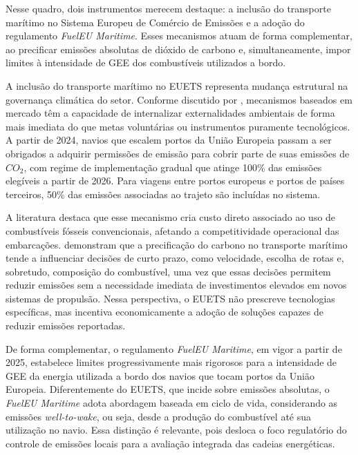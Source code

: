 Nesse quadro, dois instrumentos merecem destaque: a inclusão do transporte marítimo no Sistema Europeu de Comércio de Emissões e a adoção do regulamento \emph{FuelEU Maritime}. Esses mecanismos atuam de forma complementar, ao precificar emissões absolutas de dióxido de carbono e, simultaneamente, impor limites à intensidade de \gls{GEE} dos combustíveis utilizados a bordo.

A inclusão do transporte marítimo no \gls{EUETS} representa mudança estrutural na governança climática do setor. Conforme discutido por \citet{psaraftis_comparative_2021}, mecanismos baseados em mercado têm a capacidade de internalizar externalidades ambientais de forma mais imediata do que metas voluntárias ou instrumentos puramente tecnológicos. A partir de 2024, navios que escalem portos da União Europeia passam a ser obrigados a adquirir permissões de emissão para cobrir parte de suas emissões de $CO_2$, com regime de implementação gradual que atinge 100\% das emissões elegíveis a partir de 2026. Para viagens entre portos europeus e portos de países terceiros, 50\% das emissões associadas ao trajeto são incluídas no sistema.

A literatura destaca que esse mecanismo cria custo direto associado ao uso de combustíveis fósseis convencionais, afetando a competitividade operacional das embarcações. \citet{psaraftis_comparative_2021} demonstram que a precificação do carbono no transporte marítimo tende a influenciar decisões de curto prazo, como velocidade, escolha de rotas e, sobretudo, composição do combustível, uma vez que essas decisões permitem reduzir emissões sem a necessidade imediata de investimentos elevados em novos sistemas de propulsão. Nessa perspectiva, o \gls{EUETS} não prescreve tecnologias específicas, mas incentiva economicamente a adoção de soluções capazes de reduzir emissões reportadas.

De forma complementar, o regulamento \emph{FuelEU Maritime}, em vigor a partir de 2025, estabelece limites progressivamente mais rigorosos para a intensidade de \gls{GEE} da energia utilizada a bordo dos navios que tocam portos da União Europeia. Diferentemente do \gls{EUETS}, que incide sobre emissões absolutas, o \emph{FuelEU Maritime} adota abordagem baseada em ciclo de vida, considerando as emissões \emph{well-to-wake}, ou seja, desde a produção do combustível até sua utilização no navio. Essa distinção é relevante, pois desloca o foco regulatório do controle de emissões locais para a avaliação integrada das cadeias energéticas.

